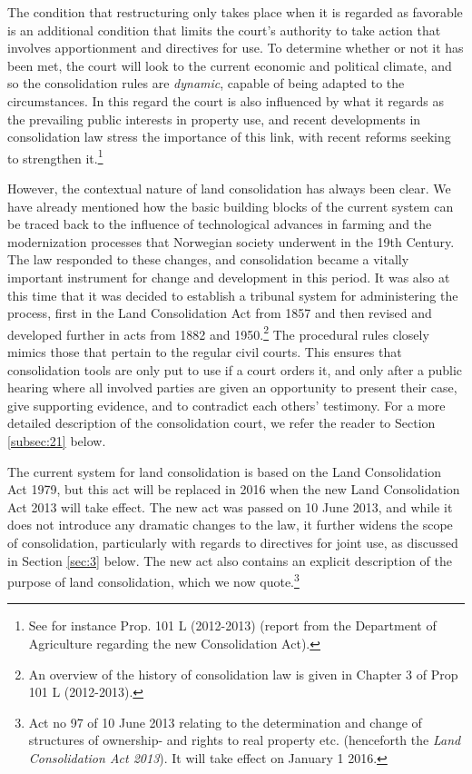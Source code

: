 \documentclass[10pt]{article} %
\begin{document}
The condition that restructuring only takes place when it is regarded as favorable is an additional condition that limits the court's authority to take action that involves apportionment and directives for use. To determine whether or not it has been met, the court will look to the current economic and political climate, and so the consolidation rules are \emph{dynamic}, capable of being adapted to the circumstances. In this regard the court is also influenced by what it regards as the prevailing public interests in property use, and recent developments in consolidation law stress the importance of this link, with recent reforms seeking to strengthen it.\footnote{See for instance Prop. 101 L (2012-2013) (report from the Department of Agriculture regarding the new Consolidation Act).}

However, the contextual nature of land consolidation has always been clear. We have already mentioned how the basic building blocks of the current system can be traced back to the influence of technological advances in farming and the modernization processes that Norwegian society underwent in the 19th Century. The law responded to these changes, and consolidation became a vitally important instrument for change and development in this period. It was also at this time that it was decided to establish a tribunal system for administering the process, first in the Land Consolidation Act from 1857 and then revised and developed further in acts from 1882 and 1950.\footnote{An overview of the history of consolidation law is given in Chapter 3 of Prop 101 L (2012-2013).} The procedural rules closely mimics those that pertain to the regular civil courts. This ensures that consolidation tools are only put to use if a court orders it, and only after a public hearing where all involved parties are given an opportunity to present their case, give supporting evidence, and to contradict each others' testimony. For a more detailed description of the consolidation court, we refer the reader to Section \ref{subsec:21} below.

The current system for land consolidation is based on the Land Consolidation Act 1979, but this act will be replaced in 2016 when the new Land Consolidation Act 2013 will take effect. The new act was passed on 10 June 2013, and while it does not introduce any dramatic changes to the law, it further widens the scope of consolidation, particularly with regards to directives for joint use, as discussed in Section \ref{sec:3} below. The new act also contains an explicit description of the purpose of land consolidation, which we now quote.\footnote{Act no 97 of 10 June 2013 relating to the determination and change of structures of ownership- and rights to real property etc. (henceforth the \emph{Land Consolidation Act 2013}). It will take effect on January 1 2016.}
\end{document}
